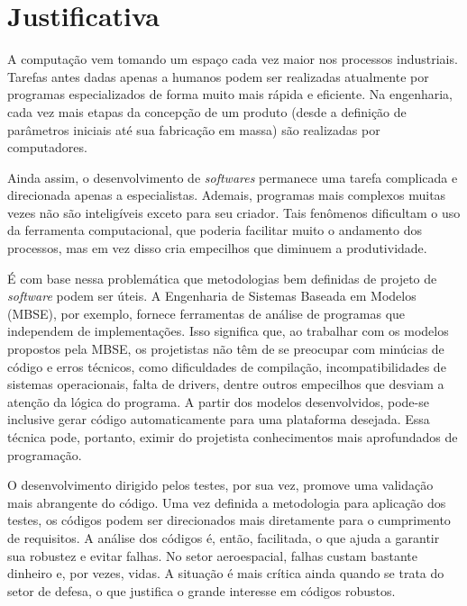 \chapter{Justificativa}

A computação vem tomando um espaço cada vez maior nos processos industriais.
Tarefas antes dadas apenas a humanos podem ser realizadas atualmente por programas especializados de forma muito mais rápida e eficiente.
Na engenharia, cada vez mais etapas da concepção de um produto (desde a definição de parâmetros iniciais até sua fabricação em massa) são realizadas por computadores.

Ainda assim, o desenvolvimento de \emph{softwares} permanece uma tarefa complicada e direcionada apenas a especialistas.
Ademais, programas mais complexos muitas vezes não são inteligíveis exceto para seu criador.
Tais fenômenos dificultam o uso da ferramenta computacional, que poderia facilitar muito o andamento dos processos, mas em vez disso cria empecilhos que diminuem a produtividade.

É com base nessa problemática que metodologias bem definidas de projeto de \emph{software} podem ser úteis.
A Engenharia de Sistemas Baseada em Modelos (MBSE), por exemplo, fornece ferramentas de análise de programas que independem de implementações.
Isso significa que, ao trabalhar com os modelos propostos pela MBSE, os projetistas não têm de se preocupar com minúcias de código e erros técnicos, como dificuldades de compilação, incompatibilidades de sistemas operacionais, falta de drivers, dentre outros empecilhos que desviam a atenção da lógica do programa.
A partir dos modelos desenvolvidos, pode-se inclusive gerar código automaticamente para uma plataforma desejada.
Essa técnica pode, portanto, eximir do projetista conhecimentos mais aprofundados de programação.

O desenvolvimento dirigido pelos testes, por sua vez, promove uma validação mais abrangente do código.
Uma vez definida a metodologia para aplicação dos testes, os códigos podem ser direcionados mais diretamente para o cumprimento de requisitos.
A análise dos códigos é, então, facilitada, o que ajuda a garantir sua robustez e evitar falhas.
No setor aeroespacial, falhas custam bastante dinheiro e, por vezes, vidas.
A situação é mais crítica ainda quando se trata do setor de defesa, o que justifica o grande interesse em códigos robustos.
